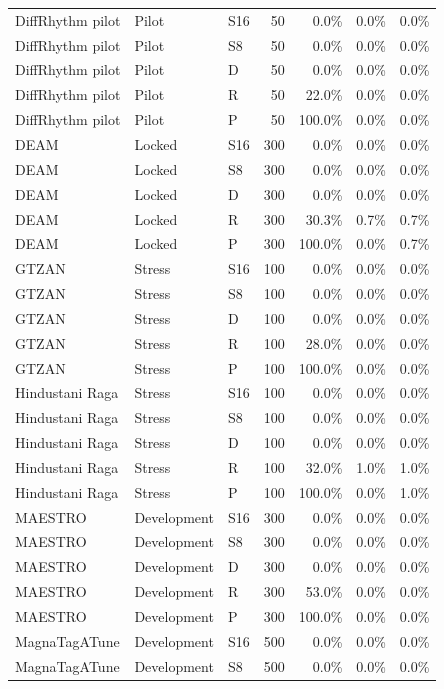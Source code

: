 \begin{longtable}{lllrrrr}
DiffRhythm pilot & Pilot & S16 & 50 & 0.0\% & 0.0\% & 0.0\% \\
DiffRhythm pilot & Pilot & S8 & 50 & 0.0\% & 0.0\% & 0.0\% \\
DiffRhythm pilot & Pilot & D & 50 & 0.0\% & 0.0\% & 0.0\% \\
DiffRhythm pilot & Pilot & R & 50 & 22.0\% & 0.0\% & 0.0\% \\
DiffRhythm pilot & Pilot & P & 50 & 100.0\% & 0.0\% & 0.0\% \\
DEAM & Locked & S16 & 300 & 0.0\% & 0.0\% & 0.0\% \\
DEAM & Locked & S8 & 300 & 0.0\% & 0.0\% & 0.0\% \\
DEAM & Locked & D & 300 & 0.0\% & 0.0\% & 0.0\% \\
DEAM & Locked & R & 300 & 30.3\% & 0.7\% & 0.7\% \\
DEAM & Locked & P & 300 & 100.0\% & 0.0\% & 0.7\% \\
GTZAN & Stress & S16 & 100 & 0.0\% & 0.0\% & 0.0\% \\
GTZAN & Stress & S8 & 100 & 0.0\% & 0.0\% & 0.0\% \\
GTZAN & Stress & D & 100 & 0.0\% & 0.0\% & 0.0\% \\
GTZAN & Stress & R & 100 & 28.0\% & 0.0\% & 0.0\% \\
GTZAN & Stress & P & 100 & 100.0\% & 0.0\% & 0.0\% \\
Hindustani Raga & Stress & S16 & 100 & 0.0\% & 0.0\% & 0.0\% \\
Hindustani Raga & Stress & S8 & 100 & 0.0\% & 0.0\% & 0.0\% \\
Hindustani Raga & Stress & D & 100 & 0.0\% & 0.0\% & 0.0\% \\
Hindustani Raga & Stress & R & 100 & 32.0\% & 1.0\% & 1.0\% \\
Hindustani Raga & Stress & P & 100 & 100.0\% & 0.0\% & 1.0\% \\
MAESTRO & Development & S16 & 300 & 0.0\% & 0.0\% & 0.0\% \\
MAESTRO & Development & S8 & 300 & 0.0\% & 0.0\% & 0.0\% \\
MAESTRO & Development & D & 300 & 0.0\% & 0.0\% & 0.0\% \\
MAESTRO & Development & R & 300 & 53.0\% & 0.0\% & 0.0\% \\
MAESTRO & Development & P & 300 & 100.0\% & 0.0\% & 0.0\% \\
MagnaTagATune & Development & S16 & 500 & 0.0\% & 0.0\% & 0.0\% \\
MagnaTagATune & Development & S8 & 500 & 0.0\% & 0.0\% & 0.0\% \\

\end{longtable}
